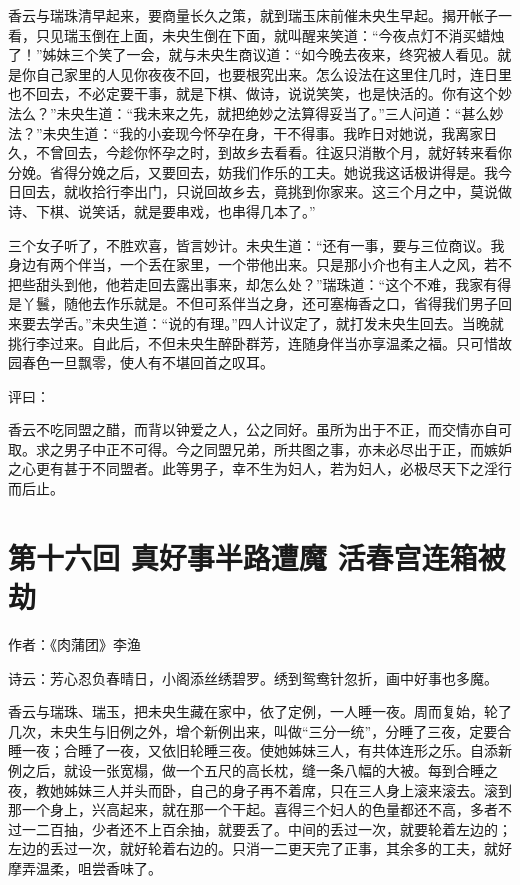 \documentclass[a4paper,12pt,UTF8,twoside]{ctexbook}
\begin{document}
香云与瑞珠清早起来，要商量长久之策，就到瑞玉床前催未央生早起。揭开帐子一看，只见瑞玉倒在上面，未央生倒在下面，就叫醒来笑道：“今夜点灯不消买蜡烛了！”姊妹三个笑了一会，就与未央生商议道：“如今晚去夜来，终究被人看见。就是你自己家里的人见你夜夜不回，也要根究出来。怎么设法在这里住几时，连日里也不回去，不必定要干事，就是下棋、做诗，说说笑笑，也是快活的。你有这个妙法么？”未央生道：“我未来之先，就把绝妙之法算得妥当了。”三人问道：“甚么妙法？”未央生道：“我的小妾现今怀孕在身，干不得事。我昨日对她说，我离家日久，不曾回去，今趁你怀孕之时，到故乡去看看。往返只消散个月，就好转来看你分娩。省得分娩之后，又要回去，妨我们作乐的工夫。她说我这话极讲得是。我今日回去，就收拾行李出门，只说回故乡去，竟挑到你家来。这三个月之中，莫说做诗、下棋、说笑话，就是要串戏，也串得几本了。”

三个女子听了，不胜欢喜，皆言妙计。未央生道：“还有一事，要与三位商议。我身边有两个伴当，一个丢在家里，一个带他出来。只是那小介也有主人之风，若不把些甜头到他，他若走回去露出事来，却怎么处？”瑞珠道：“这个不难，我家有得是丫鬟，随他去作乐就是。不但可系伴当之身，还可塞梅香之口，省得我们男子回来要去学舌。”未央生道：“说的有理。”四人计议定了，就打发未央生回去。当晚就挑行李过来。自此后，不但未央生醉卧群芳，连随身伴当亦享温柔之福。只可惜故园春色一旦飘零，使人有不堪回首之叹耳。

评曰：

香云不吃同盟之醋，而背以钟爱之人，公之同好。虽所为出于不正，而交情亦自可取。求之男子中正不可得。今之同盟兄弟，所共图之事，亦未必尽出于正，而嫉妒之心更有甚于不同盟者。此等男子，幸不生为妇人，若为妇人，必极尽天下之淫行而后止。

\chapter{第十六回 真好事半路遭魔 活春宫连箱被劫}

作者：《肉蒲团》李渔

诗云：芳心忍负春晴日，小阁添丝绣碧罗。绣到鸳鸯针忽折，画中好事也多魔。

香云与瑞珠、瑞玉，把未央生藏在家中，依了定例，一人睡一夜。周而复始，轮了几次，未央生与旧例之外，增个新例出来，叫做“三分一统”，分睡了三夜，定要合睡一夜；合睡了一夜，又依旧轮睡三夜。使她姊妹三人，有共体连形之乐。自添新例之后，就设一张宽榻，做一个五尺的高长枕，缝一条八幅的大被。每到合睡之夜，教她姊妹三人并头而卧，自己的身子再不着席，只在三人身上滚来滚去。滚到那一个身上，兴高起来，就在那一个干起。喜得三个妇人的色量都还不高，多者不过一二百抽，少者还不上百余抽，就要丢了。中间的丢过一次，就要轮着左边的；左边的丢过一次，就好轮着右边的。只消一二更天完了正事，其余多的工夫，就好摩弄温柔，咀尝香味了。
\end{document}
